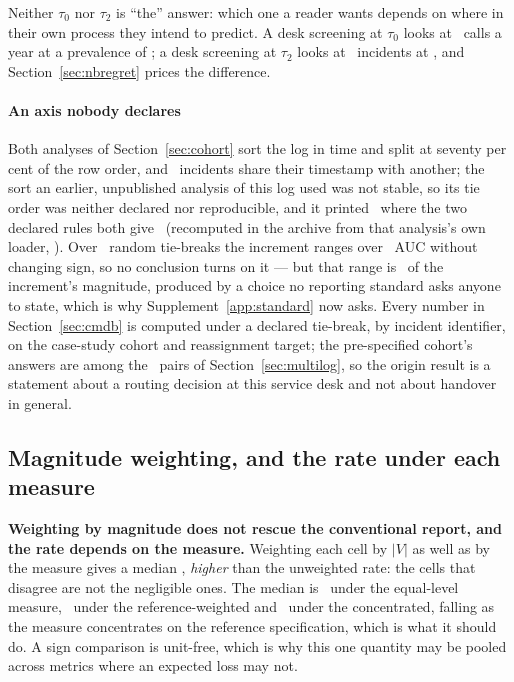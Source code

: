 Neither $\tau_0$ nor $\tau_2$ is ``the'' answer: which one a reader wants
depends on where in their own process they intend to predict. A desk screening
at $\tau_0$ looks at \nTauZero\ calls a year at a prevalence of \prevTauZero;
a desk screening at $\tau_2$ looks at \nTauTwo\ incidents at \prevTauTwo, and
Section~\ref{sec:nbregret} prices the difference.

\paragraph{An axis nobody declares}
Both analyses of Section~\ref{sec:cohort} sort the log in time and split at
seventy per cent of the row order, and \nTiedTimestamps\ incidents share
their timestamp with another; the sort an earlier, unpublished analysis of
this log used was not stable, so its tie order was neither declared nor
reproducible, and it printed \VpublishedTauTwo\ where the two declared rules
both give \VTtwoKnow\ (recomputed in the archive from that analysis's own
loader, \cohortloader). Over \nTiebreakDraws\ random tie-breaks the
increment ranges over \tiebreakRange\ AUC without changing sign, so no
conclusion turns on it --- but that range is \tiebreakRangeSharePct\ of the
increment's magnitude, produced by a choice no reporting standard asks anyone
to state, which is why Supplement~\ref{app:standard} now asks. Every number
in Section~\ref{sec:cmdb} is computed under a declared tie-break, by incident
identifier, on the case-study cohort and reassignment target; the
pre-specified cohort's answers are among the \nPairs\ pairs of
Section~\ref{sec:multilog}, so the origin result is a statement about a
routing decision at this service desk and not about handover in general.

\subsection{Magnitude weighting, and the rate under each measure}
\label{app:magnitude}


\textbf{Weighting by magnitude does not rescue the conventional report, and
the rate depends on the measure.} Weighting each cell by $|V|$ as well as by
the measure gives a median \misreportMagnitudePct, \emph{higher} than the
unweighted rate: the cells that disagree are not the negligible ones. The
median is \misreportEqualPct\ under the equal-level measure,
\misreportReferencePct\ under the reference-weighted and
\misreportConcentratedPct\ under the concentrated, falling as the measure
concentrates on the reference specification, which is what it should do. A
sign comparison is unit-free, which is why this one quantity may be pooled
across metrics where an expected loss may not.

